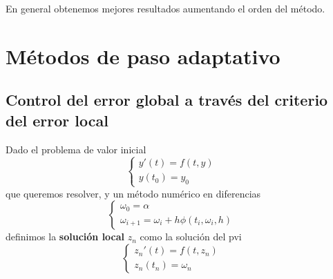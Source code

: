 En general obtenemos mejores resultados aumentando el orden del método.


\section{Métodos de paso adaptativo}
\subsection{Control del error global a través del criterio del error local}
\begin{definition}
Dado el problema de valor inicial 
$$
\left\{
\begin{array}{lll}
y'(t) = f(t,y) & & \\
y(t_0) = y_0 & &
\end{array}
\right.
$$
 que queremos resolver, y un método numérico en diferencias
\begin{equation}
\label{eq6}
\left\{
\begin{array}{lll}
\omega_0 = \alpha & & \\
\omega_{i+1} = \omega_i + h \phi(t_i, \omega_i, h) & & 
\end{array}
\right.
\end{equation}
definimos la \textbf{solución local} $z_n$ como la solución del pvi
$$
\left\{
\begin{array}{lll}
z_n'(t) = f(t,z_n) & & \\
z_n(t_n) = \omega_n & &
\end{array}
\right.
$$
\end{definition}


